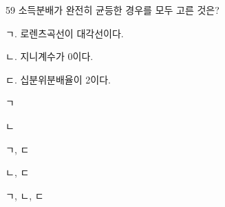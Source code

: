 \begin{question}{59}
소득분배가 완전히 균등한 경우를 모두 고른 것은?
\begin{framedtext}
ㄱ. 로렌츠곡선이 대각선이다. \par
ㄴ. 지니계수가 0이다. \par
ㄷ. 십분위분배율이 2이다. \par
\end{framedtext}
\begin{choices}
  \item ㄱ
  \item ㄴ
  \item ㄱ, ㄷ
  \item ㄴ, ㄷ
  \item ㄱ, ㄴ, ㄷ
\end{choices}
\end{question}
